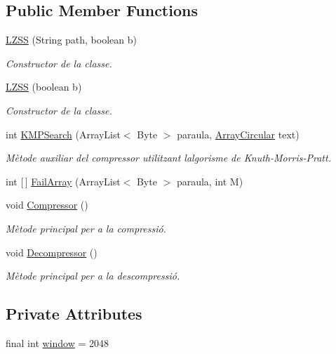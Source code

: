 \subsection*{Public Member Functions}
\begin{DoxyCompactItemize}
\item 
\hyperlink{classdomini_1_1algorithm_1_1LZSS_a8db81d23b97e401015ec60763ef13aba}{L\+Z\+SS} (String path, boolean b)
\begin{DoxyCompactList}\small\item\em Constructor de la classe. \end{DoxyCompactList}\item 
\hyperlink{classdomini_1_1algorithm_1_1LZSS_af1d7db47ad910e8bdeffb59c2f4f1caa}{L\+Z\+SS} (boolean b)
\begin{DoxyCompactList}\small\item\em Constructor de la classe. \end{DoxyCompactList}\item 
int \hyperlink{classdomini_1_1algorithm_1_1LZSS_a94b98f9eb4a4f60b9b773ecbf7fba276}{K\+M\+P\+Search} (Array\+List$<$ Byte $>$ paraula, \hyperlink{classdomini_1_1utils_1_1ArrayCircular}{Array\+Circular} text)
\begin{DoxyCompactList}\small\item\em Mètode auxiliar del compressor utilitzant l\textquotesingle{}algorisme de Knuth-\/\+Morris-\/\+Pratt. \end{DoxyCompactList}\item 
int \mbox{[}$\,$\mbox{]} \hyperlink{classdomini_1_1algorithm_1_1LZSS_a56733a42f84d7a58cc5db9ea5f67835f}{Fail\+Array} (Array\+List$<$ Byte $>$ paraula, int M)
\item 
void \hyperlink{classdomini_1_1algorithm_1_1LZSS_a047f2460b8461cdb044604dd639326a3}{Compressor} ()
\begin{DoxyCompactList}\small\item\em Mètode principal per a la compressió. \end{DoxyCompactList}\item 
void \hyperlink{classdomini_1_1algorithm_1_1LZSS_a665ab942951b839e63dc06e707bba1ad}{Decompressor} ()
\begin{DoxyCompactList}\small\item\em Mètode principal per a la descompressió. \end{DoxyCompactList}\end{DoxyCompactItemize}
\subsection*{Private Attributes}
\begin{DoxyCompactItemize}
\item 
final int \hyperlink{classdomini_1_1algorithm_1_1LZSS_a00d9f2e9bc2baa39513fad040b8e7123}{window} = 2048
\end{DoxyCompactItemize}
